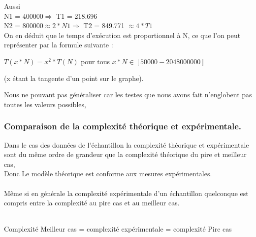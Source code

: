 \documentclass[12pt]{article}
\begin{document}
Aussi
\\
N1 = $400000 \Rightarrow $  T1 = 218.696
\\
N2 = $800000 \approx 2 * N1 \Rightarrow $  T2 = 849.771 $\approx 4 * T1 $
\\

On en déduit que le temps d'exécution est proportionnel à N, ce que l'on peut représenter par la formule suivante
: 
\begin{center}
\color{red}
	$T(x*N) = x^2*T(N)$ pour tous $ x*N \in [50000 - 2048000000] $	
	
\color{black}
(x étant la tangente d'un point sur le graphe).
\end{center}

Nous ne pouvant pas généraliser car les testes que nous avons fait n'englobent pas toutes les valeurs possibles, 
	



\subsubsection{Comparaison de la complexité théorique et expérimentale. }
Dans le cas des données de l'échantillon la complexité théorique et expérimentale sont du même ordre de grandeur que la complexité théorique du pire et meilleur cas,\\
\color{blue}
Donc Le modèle théorique est conforme aux mesures expérimentales.
\color{black}
\\
\texttt{  }
\\
Même si en générale la complexité expérimentale d'un échantillon quelconque est compris entre la complexité au pire cas et au meilleur cas.
\\
\texttt{  }
\\
\begin{center}
\color{blue}
Complexité Meilleur cas = complexité expérimentale = complexité Pire cas 
\color{black}
\end{center}
\end{document}
